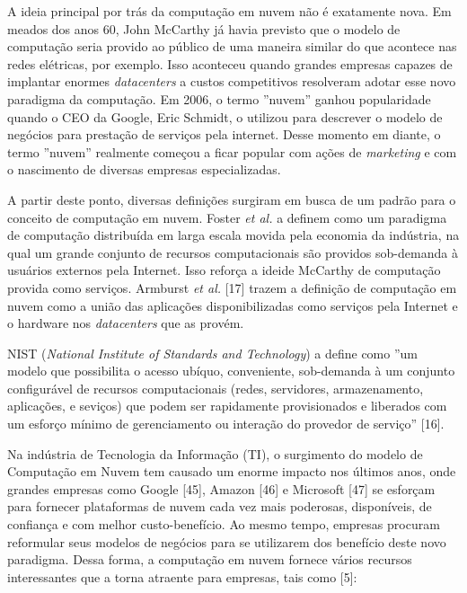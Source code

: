 A ideia principal por trás da computação em nuvem não é exatamente nova. Em meados dos anos 60, John McCarthy já havia previsto que o modelo de computação seria provido ao público de uma maneira similar do que acontece nas redes elétricas, por exemplo. Isso aconteceu quando grandes empresas capazes de implantar enormes \textit{datacenters} a custos competitivos resolveram adotar esse novo paradigma da computação. Em 2006, o termo ''nuvem'' ganhou popularidade quando o CEO da Google, Eric Schmidt, o utilizou para descrever o modelo de negócios para prestação de serviços pela internet. Desse momento em diante, o termo ''nuvem'' realmente começou a ficar popular com ações de \textit{marketing} e com o nascimento de diversas empresas especializadas. 

A partir deste ponto, diversas definições surgiram em busca de um padrão para o conceito de computação em nuvem. Foster \textit{et al.} \cite{cloud_360} a definem como um paradigma de computação distribuída em larga escala movida pela economia da indústria, na qual um grande conjunto de recursos computacionais são providos sob-demanda à usuários externos pela Internet. Isso reforça a ideide McCarthy de computação provida como serviços. Armburst \textit{et al.} [17] trazem a definição de computação em nuvem como a união das aplicações disponibilizadas como serviços pela Internet e o hardware nos \textit{datacenters} que as provém. 

NIST (\textit{National Institute of Standards and Technology}) a define como ''um modelo que possibilita o acesso ubíquo, conveniente, sob-demanda à um conjunto configurável de recursos computacionais (redes, servidores, armazenamento, aplicações, e seviços) que podem ser rapidamente provisionados e liberados com um esforço mínimo de gerenciamento ou interação do provedor de serviço'' [16]. 

Na indústria de Tecnologia da Informação (TI), o surgimento do modelo de Computação em Nuvem tem causado um enorme impacto nos últimos anos, onde grandes empresas como Google [45], Amazon [46] e Microsoft [47] se esforçam para fornecer plataformas de nuvem cada vez mais poderosas, disponíveis, de confiança e com melhor custo-benefício. Ao mesmo tempo, empresas procuram reformular seus modelos de negócios para se utilizarem dos benefício deste novo paradigma. Dessa forma, a computação em nuvem fornece vários recursos interessantes que a torna atraente para empresas, tais como [5]:

